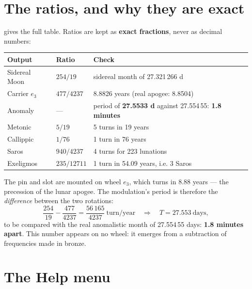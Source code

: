 \section{The ratios, and why they are exact}

 gives the full table. Ratios are kept as
\textbf{exact fractions}, never as decimal numbers:

\begin{center}
\begin{tabularx}{\textwidth}{@{}llX@{}}
\toprule
\rowcolor{lightblue}\textbf{Output} & \textbf{Ratio} & \textbf{Check} \\
\midrule
Sidereal Moon & $254/19$ & sidereal month of 27.321\,266 d \\
Carrier $e_3$ & $477/4237$ & 8.8826 years (real apogee: 8.8504) \\
Anomaly & — & period of \textbf{27.5533 d} against 27.554\,55: \textbf{1.8 minutes} \\
Metonic & $5/19$ & 5 turns in 19 years \\
Callippic & $1/76$ & 1 turn in 76 years \\
Saros & $940/4237$ & 4 turns for 223 lunations \\
Exeligmos & $235/12711$ & 1 turn in 54.09 years, i.e. 3 Saros \\
\bottomrule
\end{tabularx}
\end{center}

\begin{info}
The pin and slot are mounted on wheel $e_3$, which turns in 8.88 years — the precession of the
lunar apogee. The modulation's period is therefore the \emph{difference} between the two
rotations:
\[
  \frac{254}{19} - \frac{477}{4237} = \frac{56\,165}{4237}\ \text{turn/year}
  \quad\Longrightarrow\quad T = 27.553\ \text{days},
\]
to be compared with the real anomalistic month of 27.554\,55 days: \textbf{1.8 minutes apart}.
This number appears on no wheel: it emerges from a subtraction of frequencies made in bronze.
\end{info}

\section{The Help menu}

